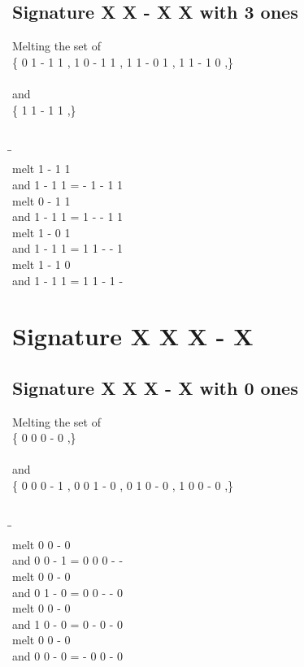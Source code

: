 \documentclass{article}
\begin{document}
\subsection{Signature X X - X X with 3 ones}
Melting the set of\\
\{ 0  1  -  1  1 , 1  0  -  1  1 , 1  1  -  0  1 , 1  1  -  1  0 ,\}\\\\
and\\
\{ 1  1  -  1  1 ,\}\\\\
\begin{tabbing}
\hspace{3cm}\=\hspace{3cm}\=\hspace{3cm}\\[1cm]
melt  1  -  1  1 \\
and  1  -  1  1 \>
 =  -  1  -  1  1 \\[1mm]
melt  0  -  1  1 \\
and  1  -  1  1 \>
 =  1  -  -  1  1 \\[1mm]
melt  1  -  0  1 \\
and  1  -  1  1 \>
 =  1  1  -  -  1 \\[1mm]
melt  1  -  1  0 \\
and  1  -  1  1 \>
 =  1  1  -  1  - \\[1mm]
\end{tabbing}
\newpage
\section{Signature X X X - X }
\subsection{Signature X X X - X with 0 ones}
Melting the set of\\
\{ 0  0  0  -  0 ,\}\\\\
and\\
\{ 0  0  0  -  1 , 0  0  1  -  0 , 0  1  0  -  0 , 1  0  0  -  0 ,\}\\\\
\begin{tabbing}
\hspace{3cm}\=\hspace{3cm}\=\hspace{3cm}\\[1cm]
melt  0  0  -  0 \\
and  0  0  -  1 \>
 =  0  0  0  -  - \\[1mm]
melt  0  0  -  0 \\
and  0  1  -  0 \>
 =  0  0  -  -  0 \\[1mm]
melt  0  0  -  0 \\
and  1  0  -  0 \>
 =  0  -  0  -  0 \\[1mm]
melt  0  0  -  0 \\
and  0  0  -  0 \>
 =  -  0  0  -  0 \\[1mm]
\end{tabbing}
\newpage
\end{document}
